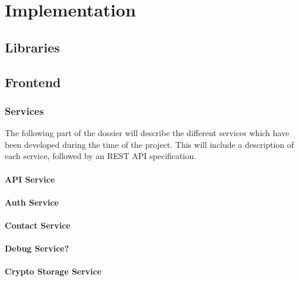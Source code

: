 \chapter{Implementation}\label{ch:implementation}

\lipsum[2-4]

\section{Libraries}

\section{Frontend}

\subsection{Services}

The following part of the dossier will describe the different services which have been developed during the time of the project.
This will include a description of each service, followed by an REST API specification.

\subsubsection{API Service}

\subsubsection{Auth Service}

\subsubsection{Contact Service}

\subsubsection{Debug Service?}

\subsubsection{Crypto Storage Service}

